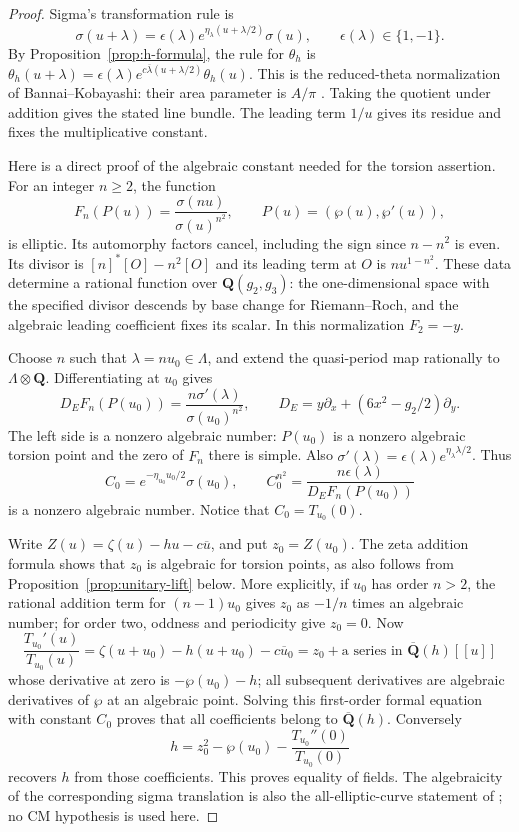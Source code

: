 \documentclass[11pt]{article}
\theoremstyle{definition}\newtheorem{definition}[theorem]{Definition}
\theoremstyle{remark}\newtheorem{remark}[theorem]{Remark}
\newcommand{\Q}{\mathbf Q}\newcommand{\Z}{\mathbf Z}
\newcommand{\Qb}{\overline{\mathbf Q}}\newcommand{\Fp}{\mathbf F_p}
\begin{document}
\begin{proof}
Sigma's transformation rule is
\[
 \sigma(u+\lambda)=\epsilon(\lambda)
 e^{\eta_\lambda(u+\lambda/2)}\sigma(u),\qquad
 \epsilon(\lambda)\in\{1,-1\}.
\]
By Proposition~\ref{prop:h-formula}, the rule for $\theta_h$ is
$\theta_h(u+\lambda)=\epsilon(\lambda)
 e^{c\overline\lambda(u+\lambda/2)}\theta_h(u)$.
This is the reduced-theta normalization of Bannai--Kobayashi: their area parameter is $A/\pi$ \cite[Examples 1.9--1.10, pp.~10--12]{BannaiKobayashi}. Taking the quotient under addition gives the stated line bundle. The leading term $1/u$ gives its residue and fixes the multiplicative constant.

Here is a direct proof of the algebraic constant needed for the torsion assertion. For an integer $n\ge2$, the function
\[
 F_n(P(u))=\frac{\sigma(nu)}{\sigma(u)^{n^2}},\qquad
 P(u)=(\wp(u),\wp'(u)),
\]
is elliptic. Its automorphy factors cancel, including the sign since $n-n^2$ is even. Its divisor is $[n]^*[O]-n^2[O]$ and its leading term at $O$ is $n u^{1-n^2}$. These data determine a rational function over $\Q(g_2,g_3)$: the one-dimensional space with the specified divisor descends by base change for Riemann--Roch, and the algebraic leading coefficient fixes its scalar. In this normalization $F_2=-y$.

Choose $n$ such that $\lambda=nu_0\in\Lambda$, and extend the quasi-period map rationally to $\Lambda\otimes\Q$. Differentiating at $u_0$ gives
\[
 D_EF_n(P(u_0))
 =\frac{n\sigma'(\lambda)}{\sigma(u_0)^{n^2}},\qquad
 D_E=y\partial_x+(6x^2-g_2/2)\partial_y.
\]
The left side is a nonzero algebraic number: $P(u_0)$ is a nonzero algebraic torsion point and the zero of $F_n$ there is simple. Also
$\sigma'(\lambda)=\epsilon(\lambda)e^{\eta_\lambda\lambda/2}$.
Thus
\[
 C_0=e^{-\eta_{u_0}u_0/2}\sigma(u_0),\qquad
 C_0^{n^2}=\frac{n\epsilon(\lambda)}{D_EF_n(P(u_0))}
\]
is a nonzero algebraic number. Notice that $C_0=T_{u_0}(0)$.

Write $Z(u)=\zeta(u)-hu-c\overline u$, and put
$z_0=Z(u_0)$. The zeta addition formula shows that $z_0$ is algebraic for torsion points, as also follows from Proposition~\ref{prop:unitary-lift} below. More explicitly, if $u_0$ has order $n>2$, the rational addition term for $(n-1)u_0$ gives $z_0$ as $-1/n$ times an algebraic number; for order two, oddness and periodicity give $z_0=0$.
Now
\[
 \frac{T_{u_0}'(u)}{T_{u_0}(u)}
 =\zeta(u+u_0)-h(u+u_0)-c\overline u_0
 =z_0+\text{a series in }\Qb(h)[[u]]
\]
whose derivative at zero is $-\wp(u_0)-h$; all subsequent derivatives are algebraic derivatives of $\wp$ at an algebraic point. Solving this first-order formal equation with constant $C_0$ proves that all coefficients belong to $\Qb(h)$. Conversely
\[
 h=z_0^2-\wp(u_0)-\frac{T_{u_0}''(0)}{T_{u_0}(0)}
\]
recovers $h$ from those coefficients. This proves equality of fields. The algebraicity of the corresponding sigma translation is also the all-elliptic-curve statement of \cite[Theorem 2.12, pp.~26--27]{BannaiKobayashi}; no CM hypothesis is used here.
\end{proof}
\end{document}
